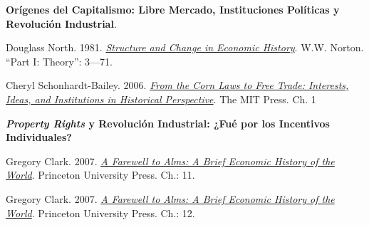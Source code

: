 \documentclass[letterpaper]{article}
\renewenvironment{itemize}{
  \begin{list}{}{
    \setlength{\leftmargin}{1.5em}
  }
}{
  \end{list}
}
\begin{document}
\begin{enumerate}[label=\roman*.]
	\item {}
		\begin{itemize}

			\item[11.] {\bf Or\'igenes del Capitalismo: Libre Mercado, Instituciones Pol\'iticas y Revoluci\'on Industrial}.
				\begin{itemize}

         \item[$\circ$]  Douglass North. 1981. \href{https://github.com/hbahamonde/Ciencia_Politica_II/raw/master/Readings/North_1981.pdf}{\emph{Structure and Change in Economic History}}. W.W. Norton. ``Part I: Theory'': 3---71.
         			
         \item[$\circ$] Cheryl Schonhardt-Bailey. 2006. \href{https://github.com/hbahamonde/Ciencia_Politica_II/raw/master/Readings/Corn_Laws.pdf}{\emph{From the Corn Laws to Free Trade: Interests, Ideas, and Institutions in Historical Perspective}}. The MIT Press. Ch. 1
        \end{itemize}


			\item[12.] {\bf \emph{Property Rights} y Revoluci\'on Industrial: ¿Fu\'e por los Incentivos Individuales?}

				\begin{itemize} 
					\item[$\circ$]  Gregory Clark. 2007. \href{https://github.com/hbahamonde/Ciencia_Politica_II/raw/master/Readings/Clark.pdf}{\emph{A Farewell to Alms: A Brief Economic History of the World}}. Princeton University Press. Ch.: 11.
					\item[$\circ$]  Gregory Clark. 2007. \href{https://github.com/hbahamonde/Ciencia_Politica_II/raw/master/Readings/Clark.pdf}{\emph{A Farewell to Alms: A Brief Economic History of the World}}. Princeton University Press. Ch.: 12.
				\end{itemize}



\end{itemize}
\end{enumerate}
\end{document}
